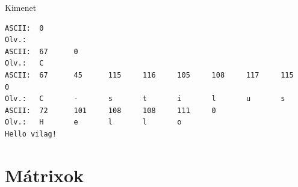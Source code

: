 \documentclass[usenames,dvipsnames,aspectratio=169]{beamer}
\begin{document}
\begin{frame}
  \begin{exampleblock}{}
    \footnotesize
    
  \end{exampleblock}
\end{frame}

\begin{frame}[fragile]
  \begin{block}{Kimenet}
    \small
    \begin{verbatim}
ASCII:  0       
Olv.:   
ASCII:  67      0       
Olv.:   C       
ASCII:  67      45      115     116     105     108     117     115     0       
Olv.:   C       -       s       t       i       l       u       s       
ASCII:  72      101     108     108     111     0       
Olv.:   H       e       l       l       o       
Hello vilag!
\end{verbatim}
  \end{block}
\end{frame}

\section{Mátrixok}
\end{document}

